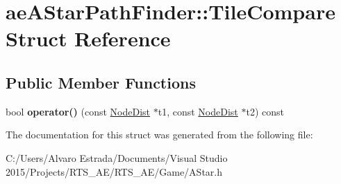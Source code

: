 \hypertarget{structae_a_star_path_finder_1_1_tile_compare}{}\section{ae\+A\+Star\+Path\+Finder\+:\+:Tile\+Compare Struct Reference}
\label{structae_a_star_path_finder_1_1_tile_compare}
\subsection*{Public Member Functions}
\begin{DoxyCompactItemize}
\item 
bool {\bfseries operator()} (const \hyperlink{structae_a_star_path_finder_1_1_node_dist}{Node\+Dist} $\ast$t1, const \hyperlink{structae_a_star_path_finder_1_1_node_dist}{Node\+Dist} $\ast$t2) const \hypertarget{structae_a_star_path_finder_1_1_tile_compare_a19cbdc60ac92e3708282ff682ccb4d4e}{}\label{structae_a_star_path_finder_1_1_tile_compare_a19cbdc60ac92e3708282ff682ccb4d4e}

\end{DoxyCompactItemize}


The documentation for this struct was generated from the following file\+:\begin{DoxyCompactItemize}
\item 
C\+:/\+Users/\+Alvaro Estrada/\+Documents/\+Visual Studio 2015/\+Projects/\+R\+T\+S\+\_\+\+A\+E/\+R\+T\+S\+\_\+\+A\+E/\+Game/A\+Star.\+h\end{DoxyCompactItemize}
